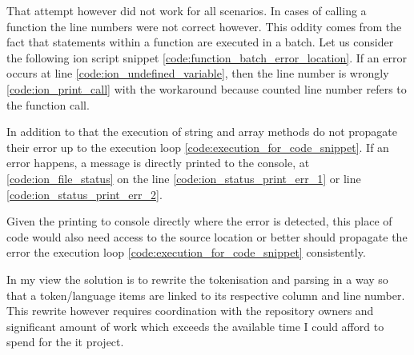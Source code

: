 \clearpage


That attempt however did not work for all scenarios.
In cases of calling a function the line numbers were not correct however.
This oddity comes from the fact that statements within a function are executed in a batch.
Let us consider the following ion script snippet \ref{code:function_batch_error_location}.
If an error occurs at line \ref{code:ion_undefined_variable},
then the line number is wrongly \ref{code:ion_print_call}
with the workaround because counted line number refers to the function call.

\clearpage


In addition to that the execution of string and array methods do not propagate their error up to the execution loop \ref{code:execution_for_code_snippet}.
If an error happens, a message is directly printed to the console,
at \ref{code:ion_file_status} on the line \ref{code:ion_status_print_err_1} or line \ref{code:ion_status_print_err_2}.

Given the printing to console directly where the error is detected,
this place of code would also need access to the source location
or better should propagate the error the execution loop \ref{code:execution_for_code_snippet} consistently.


In my view the solution is to rewrite the tokenisation and parsing in a way so that
a token/language items are linked to its respective column and line number.
This rewrite however requires coordination with the repository owners and significant amount of work
which exceeds the available time I could afford to spend for the it project.

